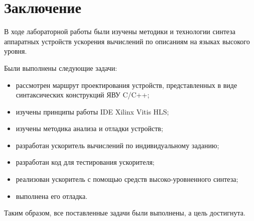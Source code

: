 \chapter*{Заключение}

В ходе лабораторной работы были изучены методики и технологии синтеза
аппаратных устройств ускорения вычислений по описаниям на языках высокого
уровня.

Были выполнены следующие задачи:
\begin{itemize}
    \item рассмотрен маршрут проектирования устройств, представленных в
          виде синтаксических конструкций ЯВУ C/C++;
    \item изучены принципы работы IDE Xilinx Vitis HLS;
    \item изучены методика анализа и отладки устройств;
    \item разработан ускоритель вычислений по индивидуальному заданию;
    \item разработан код для тестирования ускорителя;
    \item реализован ускоритель с помощью средств высоко-уровненного синтеза;
    \item выполнена его отладка.
\end{itemize}

Таким образом, все поставленные задачи были выполнены, а цель достигнута.
